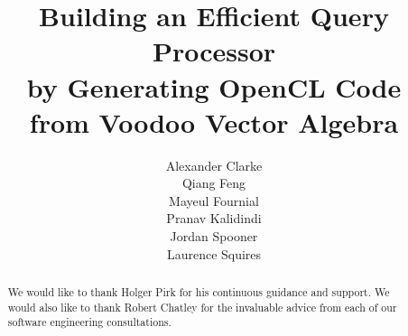 \documentclass[a4paper, twoside]{report}
\title{Building an Efficient Query Processor \\ by Generating OpenCL Code \\ from Voodoo Vector Algebra}
\author{Alexander Clarke \\ Qiang Feng \\ Mayeul Fournial \\ Pranav Kalidindi \\ Jordan Spooner \\ Laurence Squires}
\begin{document}


\renewcommand{\abstractname}{Acknowledgements}
\begin{abstract}
We would like to thank Holger Pirk for his continuous guidance and support. We would also like to thank Robert Chatley for the invaluable advice from each of our software engineering consultations.
\end{abstract}

\tableofcontents












\end{document}
